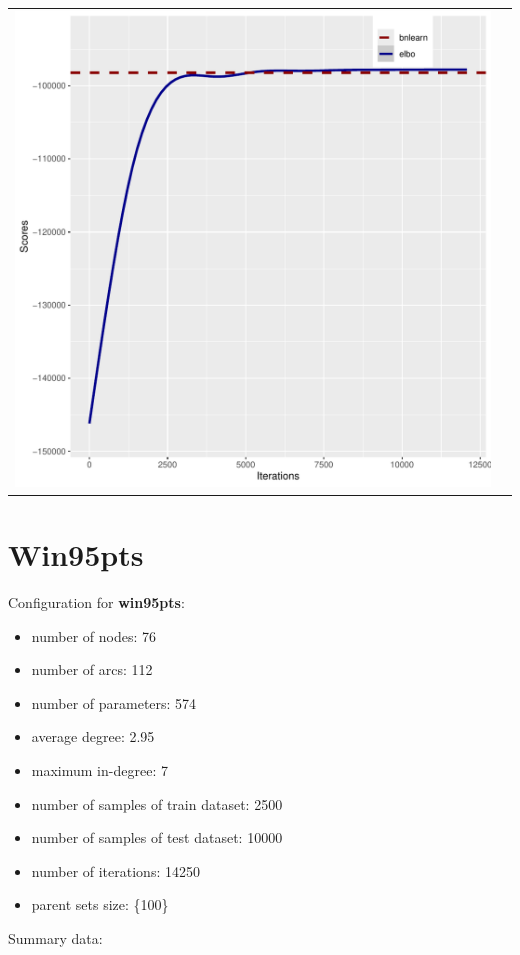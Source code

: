 \documentclass[]{scrartcl}
\begin{document}
\begin{tabular}{cc}
\includegraphics[scale = 0.4]{./figs/hepar2/mapEvolution-5-12077.pdf} &  \\
\end{tabular}


\section{Win95pts}

Configuration for \textbf{win95pts}:

\begin{itemize}
\item number of nodes: 76
\item number of arcs: 112
\item number of parameters: 574
\item average degree: 2.95
\item maximum in-degree: 7
\item number of samples of train dataset: 2500
\item number of samples of test dataset: 10000
\item number of iterations: 14250
\item parent sets size: \{100\}
\end{itemize}


Summary data:
\end{document}
